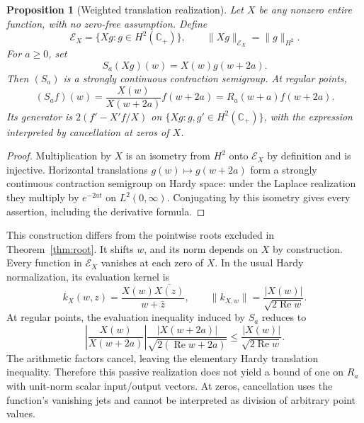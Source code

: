 \documentclass[11pt,letterpaper]{article}
\newtheorem{proposition}[theorem]{Proposition}
\newcommand{\CP}{\mathbb C_+}
\newcommand{\Rea}{\operatorname{Re}}
\begin{document}
\begin{proposition}[Weighted translation realization]\label{prop:weighted}
Let $X$ be any nonzero entire function, with no zero-free assumption. Define
\[
 \mathcal E_X=\{Xg:g\in H^2(\CP)\},\qquad \|Xg\|_{\mathcal E_X}=\|g\|_{H^2}.
\]
For $a\geq0$, set
\[
 S_a(Xg)(w)=X(w)g(w+2a).
\]
Then $(S_a)$ is a strongly continuous contraction semigroup. At regular points,
\[
 (S_af)(w)=\frac{X(w)}{X(w+2a)}f(w+2a)=R_a(w+a)f(w+2a).
\]
Its generator is $2(f'-X'f/X)$ on $\{Xg:g,g'\in H^2(\CP)\}$, with the expression interpreted by cancellation at zeros of $X$.
\end{proposition}
\begin{proof}
Multiplication by $X$ is an isometry from $H^2$ onto $\mathcal E_X$ by definition and is injective. Horizontal translations $g(w)\mapsto g(w+2a)$ form a strongly continuous contraction semigroup on Hardy space: under the Laplace realization they multiply by $e^{-2at}$ on $L^2(0,\infty)$. Conjugating by this isometry gives every assertion, including the derivative formula.
\end{proof}
This construction differs from the pointwise roots excluded in Theorem~\ref{thm:root}. It shifts $w$, and its norm depends on $X$ by construction. Every function in $\mathcal E_X$ vanishes at each zero of $X$. In the usual Hardy normalization, its evaluation kernel is
\[
 k_X(w,z)=\frac{X(w)\overline{X(z)}}{w+\bar z},\qquad
 \|k_{X,w}\|=\frac{|X(w)|}{\sqrt{2\Rea w}}.
\]
At regular points, the evaluation inequality induced by $S_a$ reduces to
\[
 \left|\frac{X(w)}{X(w+2a)}\right|
 \frac{|X(w+2a)|}{\sqrt{2(\Rea w+2a)}}
 \leq\frac{|X(w)|}{\sqrt{2\Rea w}}.
\]
The arithmetic factors cancel, leaving the elementary Hardy translation inequality. Therefore this passive realization does not yield a bound of one on $R_a$ with unit-norm scalar input/output vectors. At zeros, cancellation uses the function's vanishing jets and cannot be interpreted as division of arbitrary point values.
\end{document}
